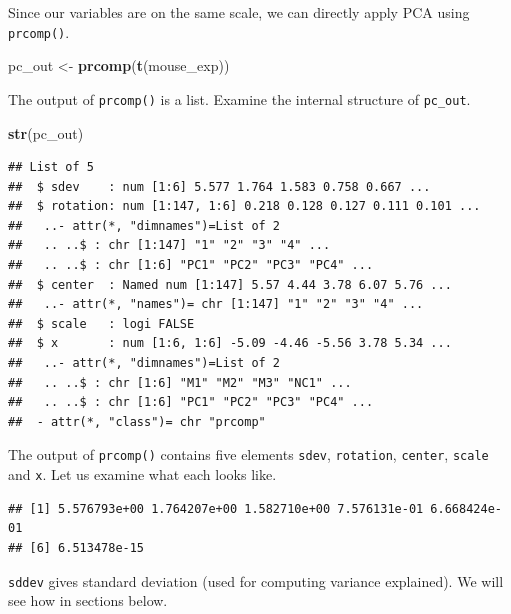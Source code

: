 \documentclass[
]{book}
\newenvironment{Shaded}{\begin{snugshade}}{\end{snugshade}}
\newcommand{\FunctionTok}[1]{\textcolor[rgb]{0.13,0.29,0.53}{\textbf{#1}}}
\newcommand{\NormalTok}[1]{#1}
\newcommand{\OtherTok}[1]{\textcolor[rgb]{0.56,0.35,0.01}{#1}}
\newcommand{\SpecialCharTok}[1]{\textcolor[rgb]{0.81,0.36,0.00}{\textbf{#1}}}
\begin{document}
Since our variables are on the same scale, we can directly apply PCA using \texttt{prcomp()}.

\begin{Shaded}
\begin{Highlighting}[]
\NormalTok{pc\_out }\OtherTok{\textless{}{-}} \FunctionTok{prcomp}\NormalTok{(}\FunctionTok{t}\NormalTok{(mouse\_exp))}
\end{Highlighting}
\end{Shaded}

The output of \texttt{prcomp()} is a list. Examine the internal structure of \texttt{pc\_out}.

\begin{Shaded}
\begin{Highlighting}[]
\FunctionTok{str}\NormalTok{(pc\_out)}
\end{Highlighting}
\end{Shaded}

\begin{verbatim}
## List of 5
##  $ sdev    : num [1:6] 5.577 1.764 1.583 0.758 0.667 ...
##  $ rotation: num [1:147, 1:6] 0.218 0.128 0.127 0.111 0.101 ...
##   ..- attr(*, "dimnames")=List of 2
##   .. ..$ : chr [1:147] "1" "2" "3" "4" ...
##   .. ..$ : chr [1:6] "PC1" "PC2" "PC3" "PC4" ...
##  $ center  : Named num [1:147] 5.57 4.44 3.78 6.07 5.76 ...
##   ..- attr(*, "names")= chr [1:147] "1" "2" "3" "4" ...
##  $ scale   : logi FALSE
##  $ x       : num [1:6, 1:6] -5.09 -4.46 -5.56 3.78 5.34 ...
##   ..- attr(*, "dimnames")=List of 2
##   .. ..$ : chr [1:6] "M1" "M2" "M3" "NC1" ...
##   .. ..$ : chr [1:6] "PC1" "PC2" "PC3" "PC4" ...
##  - attr(*, "class")= chr "prcomp"
\end{verbatim}

The output of \texttt{prcomp()} contains five elements \texttt{sdev}, \texttt{rotation}, \texttt{center}, \texttt{scale} and \texttt{x}. Let us examine what each looks like.

\begin{Shaded}
\end{Shaded}

\begin{verbatim}
## [1] 5.576793e+00 1.764207e+00 1.582710e+00 7.576131e-01 6.668424e-01
## [6] 6.513478e-15
\end{verbatim}

\texttt{sddev} gives standard deviation (used for computing variance explained). We will see how in sections below.
\end{document}

